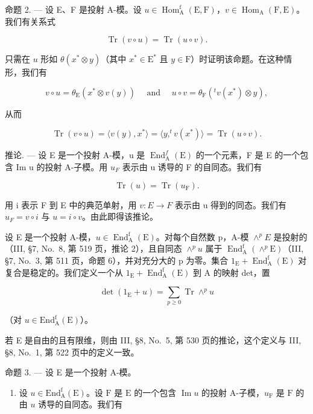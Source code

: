 命题 2. --- 设 E、F 是投射 A-模。设 \(u \in \operatorname{Hom}_{\mathrm{A}}^{\mathrm{f}}(\mathrm{E}, \mathrm{F})\)，\(v \in \operatorname{Hom}_{\mathrm{A}}(\mathrm{F}, \mathrm{E})\)。我们有关系式

\[
\operatorname{Tr} (v \circ u) = \operatorname{Tr} (u \circ v).\tag{3}
\]

只需在 \(u\) 形如 \(\theta(x^{*} \otimes y)\)（其中 \(x^{*} \in \mathrm{E}^{*}\) 且 \(y \in \mathrm{F}\)）时证明该命题。在这种情形，我们有

\[
v \circ u = \theta_ {\mathrm{E}} (x ^ {*} \otimes v (y)) \quad \text { and } \quad u \circ v = \theta_ {\mathrm{F}} (^ {t} v (x ^ {*}) \otimes y)  ,
\]

从而

\[
\operatorname{Tr} (v \circ u) = \langle v (y), x ^ {*} \rangle = \langle y, ^ {t} v (x ^ {*}) \rangle = \operatorname{Tr} (u \circ v).
\]

推论. --- 设 E 是一个投射 A-模，u 是 \(\operatorname{End}_{\mathrm{A}}^{f}(\mathrm{E})\) 的一个元素，F 是 E 的一个包含 Im u 的投射 A-子模。用 \(u_{F}\) 表示由 u 诱导的 F 的自同态。我们有

\[
\operatorname{Tr} (u) = \operatorname{Tr} (u _ {\mathrm{F}}).\tag{4}
\]

用 i 表示 F 到 E 中的典范单射，用 \(v: E \rightarrow F\) 表示由 u 得到的同态。我们有 \(u_{F} = v \circ i\) 与 \(u = i \circ v\)。由此即得该推论。

设 E 是一个投射 A-模，\(u \in \operatorname{End}_{\mathrm{A}}^{\mathrm{f}}(\mathrm{E})\)。对每个自然数 p，A-模 \(\wedge^{p}E\) 是投射的（III, §7, No.~8, 第 519 页，推论 2），且自同态 \(\wedge^{p}u\) 属于 \(\operatorname{End}_{\mathrm{A}}^{\mathrm{f}}(\wedge^{p}\mathrm{E})\)（III, §7, No.~3, 第 511 页，命题 6），并对充分大的 p 为零。集合 \(1_{\mathrm{E}} + \operatorname{End}_{\mathrm{A}}^{\mathrm{f}}(\mathrm{E})\) 对复合是稳定的。我们定义一个从 \(1_{\mathrm{E}} + \operatorname{End}_{\mathrm{A}}^{\mathrm{f}}(\mathrm{E})\) 到 A 的映射 det，置

\[
\det (1 _ {\mathrm{E}} + u) = \sum_ {p \geqslant 0} \operatorname{Tr} \wedge^ {p} u
\]

（对 \(u\in \mathrm{End}_{\mathrm{A}}^{\mathrm{f}}(\mathrm{E})\)）。

若 E 是自由的且有限维，则由 III, §8, No.~5, 第 530 页的推论，这个定义与 III, §8, No.~1, 第 522 页中的定义一致。

命题 3. --- 设 E 是一个投射 A-模。

\begin{enumerate}
\def\labelenumi{\alph{enumi})}
\tightlist
\item
  设 \(u \in \mathrm{End}_{\mathrm{A}}^{\mathrm{f}}(\mathrm{E})\)。设 \(\mathrm{F}\) 是 \(\mathrm{E}\) 的一个包含 \(\operatorname{Im} u\) 的投射 A-子模，\(u_{\mathrm{F}}\) 是 \(\mathrm{F}\) 的由 \(u\) 诱导的自同态。我们有
\end{enumerate}

